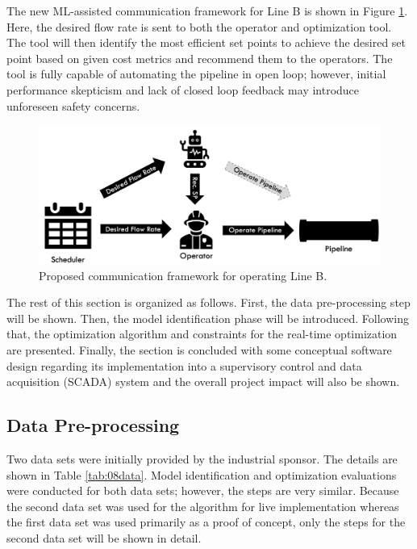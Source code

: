 The new ML-assisted communication framework for Line B is shown in Figure \ref{fig:08scheduleV2}. Here, the desired flow rate is sent to both the operator and optimization tool.  The tool will then identify the most efficient set points to achieve the desired set point based on given cost metrics and recommend them to the operators.  The tool is fully capable of automating the pipeline in open loop; however, initial performance skepticism and lack of closed loop feedback may introduce unforeseen safety concerns.

\begin{figure}[h]
    \centering
    \includegraphics[scale=0.35]{images/suncor/08ScheduleV2.png}
    \caption{Proposed communication framework for operating Line B.}
    \label{fig:08scheduleV2}
\end{figure}

The rest of this section is organized as follows.  First, the data pre-processing step will be shown.  Then, the model identification phase will be introduced.  Following that, the optimization algorithm and constraints for the real-time optimization are presented.  Finally, the section is concluded with some conceptual software design regarding its implementation into a supervisory control and data acquisition (SCADA) system and the overall project impact will also be shown.

\subsection{Data Pre-processing}
Two data sets were initially provided by the industrial sponsor.  The details are shown in Table \ref{tab:08data}. Model identification and optimization evaluations were conducted for both data sets; however, the steps are very similar.  Because the second data set was used for the algorithm for live implementation whereas the first data set was used primarily as a proof of concept, only the steps for the second data set will be shown in detail.

